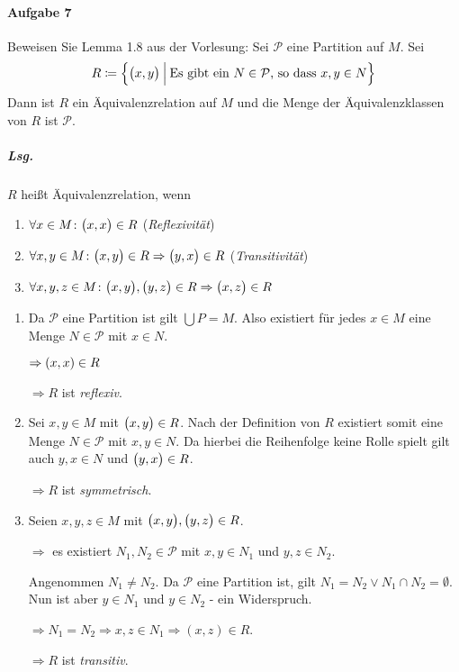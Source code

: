 \documentclass{scrreprt}
\begin{document}
\newpage
\paragraph{Aufgabe 7} Beweisen Sie Lemma 1.8 aus der Vorlesung:
Sei $\mathcal{P}$ eine Partition auf $M$.
Sei
\[
  R \coloneqq \qty\Big{\qty\big(x, y) \: {\Big |} \:
    \text{Es gibt ein } N \in \mathcal{P} \text{, so dass } x, y \in N}
\]
Dann ist $R$ ein Äquivalenzrelation auf $M$ und die Menge der Äquivalenzklassen
von $R$ ist $\mathcal{P}$.

\subparagraph{Lsg.} $R$ heißt Äquivalenzrelation, wenn
\begin{enumerate}[(1)]
\item $\forall x \in M \colon \qty\big(x, x) \in R$ (\emph{Reflexivität})
\item $\forall x, y \in M \colon \qty\big(x, y) \in R
  \Rightarrow \qty\big(y, x) \in R$ (\emph{Transitivität})

\item $\forall x, y, z \in M \colon \qty\big(x, y), \qty\big(y, z) \in R
  \Rightarrow \qty\big(x, z) \in R$
\end{enumerate}

\begin{enumerate}[label={Zu (\arabic*)}]
\item Da $\mathcal{P}$ eine Partition ist gilt $\bigcup P = M$.
  Also existiert für jedes $x \in M$ eine Menge $N \in \mathcal{P}$
  mit $x \in N$.

  $\Rightarrow \qty(x, x) \in R$

  $\Rightarrow R$ ist \emph{reflexiv}.

\item Sei $x, y \in M$ mit $\qty\big(x, y) \in R$.
  Nach der Definition von $R$ existiert somit eine Menge $N \in \mathcal{P}$
  mit $x, y \in N$.
  Da hierbei die Reihenfolge keine Rolle spielt gilt auch $y, x \in N$ und
  $\qty\big(y, x) \in R$.

  $\Rightarrow R$ ist \emph{symmetrisch}.

\item Seien $x, y, z \in M$ mit $\qty\big(x, y), \qty\big(y, z) \in R$.

  $\Rightarrow$ es existiert $N_1, N_2 \in \mathcal{P}$ mit $x, y \in N_1$
  und $y, z \in N_2$.

  Angenommen $N_1 \ne N_2$.
  Da $\mathcal{P}$ eine Partition ist, gilt $N_1 = N_2 \lor N_1 \cap N_2 = \emptyset$.
  Nun ist aber $y \in N_1$ und $y \in N_2$ - ein Widerspruch.

  $\Rightarrow N_1 = N_2 \Rightarrow x, z \in N_1 \Rightarrow (x, z) \in R$.

  $\Rightarrow R$ ist \emph{transitiv}.
\end{enumerate}
\end{document}

